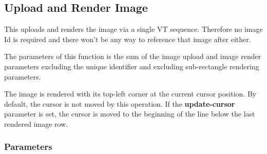 \documentclass[a4paper]{article}
\begin{document}
\subsection{Upload and Render Image} %

This uploads and renders the image via a single VT sequence. Therefore no image Id
is required and there won't be any way to reference that image after either.

The parameters of this function is the sum of the image upload and image render parameters excluding the unique
identifier and excluding sub-rectangle rendering parameters.

The image is rendered with its top-left corner at the current cursor position.
By default, the cursor is not moved by this operation.
If the \textbf{update-cursor} parameter is set,
the cursor is moved to the beginning of the line below the last rendered image row.

\subsubsection*{Parameters}
\end{document}
